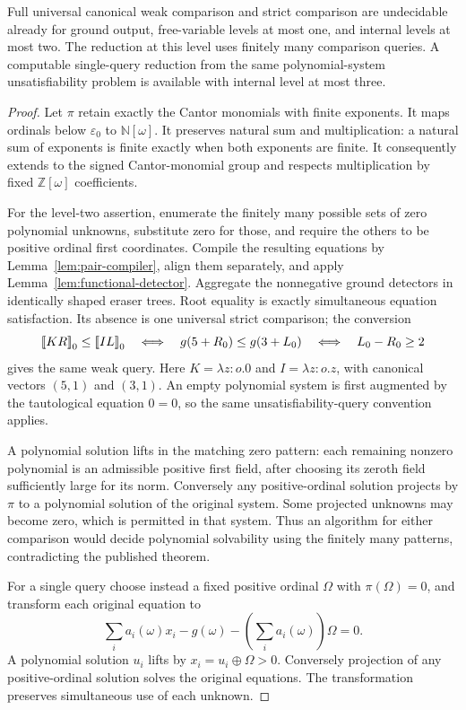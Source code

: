 \begin{theorem}
\label{thm:functional-hardness}
Full universal canonical weak comparison and strict comparison are
undecidable already for ground output, free-variable levels at most one,
and internal levels at most two.  The reduction at this level uses finitely
many comparison queries.  A computable single-query reduction from the
same polynomial-system unsatisfiability problem is available with internal
level at most three.
\end{theorem}
\begin{proof}
Let $\pi$ retain exactly the Cantor monomials with finite exponents.
It maps ordinals below $\varepsilon_0$ to $\mathbb N[\omega]$.
It preserves natural sum and multiplication: a natural sum of exponents
is finite exactly when both exponents are finite.  It consequently extends
to the signed Cantor-monomial group and respects multiplication by fixed
$\mathbb Z[\omega]$ coefficients.

For the level-two assertion, enumerate the finitely many possible sets of
zero polynomial unknowns, substitute zero for those, and require the others
to be positive ordinal first coordinates.  Compile the resulting equations
by Lemma~\ref{lem:pair-compiler}, align them separately, and apply
Lemma~\ref{lem:functional-detector}.  Aggregate the nonnegative ground
detectors in identically shaped eraser trees.  Root equality is exactly
simultaneous equation satisfaction.  Its absence is one universal strict
comparison; the conversion
\[
 \mathopen{[\![}KR\mathclose{]\!]}_0\le\mathopen{[\![}IL\mathclose{]\!]}_0\quad\Longleftrightarrow\quad
 g(5+R_0)\le g(3+L_0)\quad\Longleftrightarrow\quad L_0-R_0\ge2
\]
 gives the same weak query. Here $K=\lambda z:o.0$ and
$I=\lambda z:o.z$, with canonical vectors $(5,1)$ and $(3,1)$.
An empty polynomial system is first augmented by the tautological equation
$0=0$, so the same unsatisfiability-query convention applies.

A polynomial solution lifts in the matching zero pattern: each remaining
nonzero polynomial is an admissible positive first field, after choosing its
zeroth field sufficiently large for its norm.  Conversely any positive-ordinal
solution projects by $\pi$ to a polynomial solution of the original system.
Some projected unknowns may become zero, which is permitted in that system.
Thus an algorithm for either comparison would decide polynomial solvability
using the finitely many patterns, contradicting the published theorem.

For a single query choose instead a fixed positive ordinal $\Omega$ with
$\pi(\Omega)=0$, and transform each original equation to
\[
 \sum_i a_i(\omega)x_i-g(\omega)
                    -\left(\sum_i a_i(\omega)\right)\Omega=0.
\]
A polynomial solution $u_i$ lifts by $x_i=u_i\oplus\Omega>0$.
Conversely projection of any positive-ordinal solution solves the original
equations.  The transformation preserves simultaneous use of each unknown.


\end{proof}
